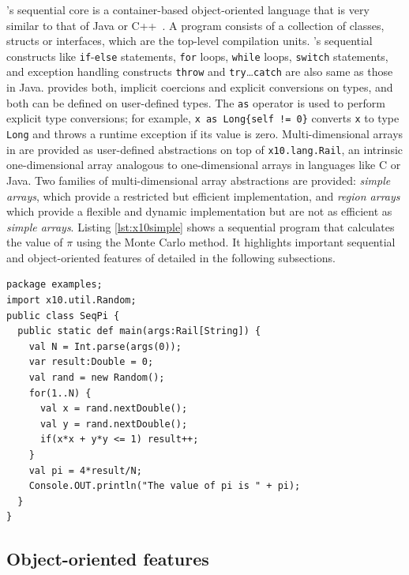 \xten's sequential core is a container-based object-oriented language that is 
very similar to that of Java or C++~\cite{specs}. A \xten program consists of a
collection of classes, structs or interfaces, which are the top-level compilation
units.
\xten's sequential
constructs like \texttt{if}-\texttt{else} statements, \texttt{for} loops,
\texttt{while} loops, \texttt{switch} statements, and exception handling
constructs \texttt{throw} and \texttt{try}\ldots\texttt{catch} are also same 
as those in Java. 
\xten provides both, implicit coercions and explicit conversions on types, and 
both can
be defined on user-defined types. The \texttt{as} operator is used to perform
explicit type conversions; for example, \texttt{x as Long\{self != 0\}} converts
\texttt{x} to type \texttt{Long} and throws a runtime exception if its value is
zero. Multi-dimensional arrays in \xten are provided as user-defined abstractions on top of
\texttt{x10.lang.Rail}, an intrinsic one-dimensional array analogous to
one-dimensional arrays in languages like C or Java. Two families of
multi-dimensional array abstractions are provided: \emph{simple arrays}, which
provide
a restricted but efficient implementation, and \emph{region arrays} which
provide
a flexible and dynamic implementation but are not as efficient as \emph{simple
arrays}.
Listing \ref{lst:x10simple} shows a sequential 
\xten program that calculates the value of $\pi$
using the Monte Carlo method. It highlights important sequential and
object-oriented features of \xten detailed in the following subsections.

\begin{lstlisting}[caption={Sequential \xten program to calculate value of $\pi$
using Monte Carlo method},label={lst:x10simple},language=x10,numbers=none]
package examples;
import x10.util.Random;
public class SeqPi {
  public static def main(args:Rail[String]) {
    val N = Int.parse(args(0));
    var result:Double = 0;
    val rand = new Random();
    for(1..N) {
      val x = rand.nextDouble();
      val y = rand.nextDouble();
      if(x*x + y*y <= 1) result++;
    }
    val pi = 4*result/N;
    Console.OUT.println("The value of pi is " + pi);
  }
}

\end{lstlisting}

\subsection{Object-oriented features}

